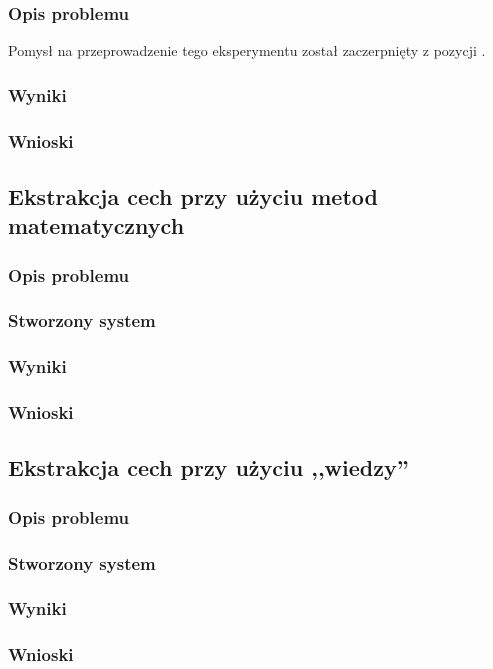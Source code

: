 \subsubsection{Opis problemu}
Pomysł na przeprowadzenie tego eksperymentu został zaczerpnięty z pozycji \cite{krzysko}. 
\subsubsection{Wyniki}
\subsubsection{Wnioski}

\subsection{Ekstrakcja cech przy użyciu metod matematycznych}
\subsubsection{Opis problemu}
\subsubsection{Stworzony system}
\subsubsection{Wyniki}
\subsubsection{Wnioski}

\subsection{Ekstrakcja cech przy użyciu ,,wiedzy''}
\subsubsection{Opis problemu}
\subsubsection{Stworzony system}
\subsubsection{Wyniki}
\subsubsection{Wnioski}

